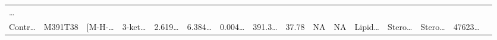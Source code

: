 \documentclass[
]{article}
\begin{document}
\begin{longtable}[]{@{}llllllllllllllll@{}}
\begin{minipage}[t]{0.02\columnwidth}
\ldots{}\strut
\end{minipage}\tabularnewline
\begin{minipage}[t]{0.04\columnwidth}\raggedright
Contr\ldots{}\strut
\end{minipage} & \begin{minipage}[t]{0.04\columnwidth}\raggedright
M391T38\strut
\end{minipage} & \begin{minipage}[t]{0.04\columnwidth}\raggedright
{[}M-H-\ldots{}\strut
\end{minipage} & \begin{minipage}[t]{0.04\columnwidth}\raggedright
3-ket\ldots{}\strut
\end{minipage} & \begin{minipage}[t]{0.04\columnwidth}\raggedright
2.619\ldots{}\strut
\end{minipage} & \begin{minipage}[t]{0.04\columnwidth}\raggedright
6.384\ldots{}\strut
\end{minipage} & \begin{minipage}[t]{0.04\columnwidth}\raggedright
0.004\ldots{}\strut
\end{minipage} & \begin{minipage}[t]{0.04\columnwidth}\raggedright
391.3\ldots{}\strut
\end{minipage} & \begin{minipage}[t]{0.04\columnwidth}\raggedright
37.78\strut
\end{minipage} & \begin{minipage}[t]{0.04\columnwidth}\raggedright
NA\strut
\end{minipage} & \begin{minipage}[t]{0.03\columnwidth}\raggedright
NA\strut
\end{minipage} & \begin{minipage}[t]{0.04\columnwidth}\raggedright
Lipid\ldots{}\strut
\end{minipage} & \begin{minipage}[t]{0.04\columnwidth}\raggedright
Stero\ldots{}\strut
\end{minipage} & \begin{minipage}[t]{0.04\columnwidth}\raggedright
Stero\ldots{}\strut
\end{minipage} & \begin{minipage}[t]{0.04\columnwidth}\raggedright
47623\ldots{}\strut
\end{minipage} & \begin{minipage}[t]{0.02\columnwidth}\raggedright

\end{minipage}
\end{longtable}
\end{document}
